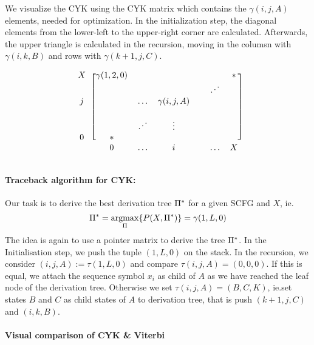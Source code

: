 We visualize the CYK using the CYK matrix which contains the \(\gamma(i,j,A)\)
elements, needed for optimization.  In the initialization step, the diagonal
elements from the lower-left to the upper-right corner are calculated.
Afterwards, the upper triangle is calculated in the recursion, moving in the
columsn with \(\gamma(i,k,B)\) and rows with \(\gamma(k+1,j,C)\).

\newcommand{\udots}{\reflectbox{$\ddots$}}
\[
\begin{blockarray}{ccccccc}
\begin{block}{c[cccccc]}
X      & \gamma(1,2,0) &        &   &               &        & * \\
       &        &        &   &               & \udots &   \\
j      &        & \hdots & \gamma(i,j,A)  &               &        &  \\
       &        &        &   &               &        &  \\
       &        & \udots & \vdots &               &        &  \\
0      & *      &        &   &               &        &  \\
\end{block}
       & 0      & \hdots & i &               & \hdots & X
\end{blockarray}
\]

\paragraph{Traceback algorithm for CYK:}  Our task is to derive the best
derivation tree \(\Pi^*\) for a given SCFG and \(X\), ie.\@
\[
  \Pi^* = \operatorname*{argmax}_{\Pi} \{ P(X,\Pi^*) \} = \gamma(1,L,0)
\]
The idea is again to use a pointer matrix to derive the tree \(\Pi^*\).
In the Initialisation step, we push the tuple \((1,L,0)\) on the stack.
In the recursion, we consider \((i,j,A):=\tau(1,L,0)\) and compare
\(\tau(i,j,A) = (0,0,0)\).  If this is equal, we attach the sequence symbol
\(x_i\) as child of \(A\) as we have reached the leaf node of the derivation
tree.  Otherwise we set \(\tau(i,j,A)=(B,C,K)\), ie.\@ set states \(B\) and
\(C\) as child states of \(A\) to derivation tree, that is push \((k+1, j, C)\)
and \((i,k,B)\).

\paragraph{Visual comparison of CYK \& Viterbi}

